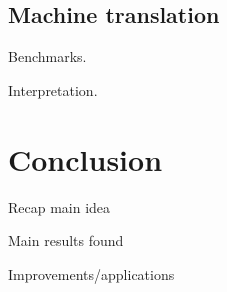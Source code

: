 \documentclass[journal]{IEEEtran}
\begin{document}
\subsection{Machine translation}
\cite{savoy09}

Benchmarks.

Interpretation.



\section{Conclusion}
Recap main idea

Main results found

Improvements/applications

\cite{peters12}



\end{document}
